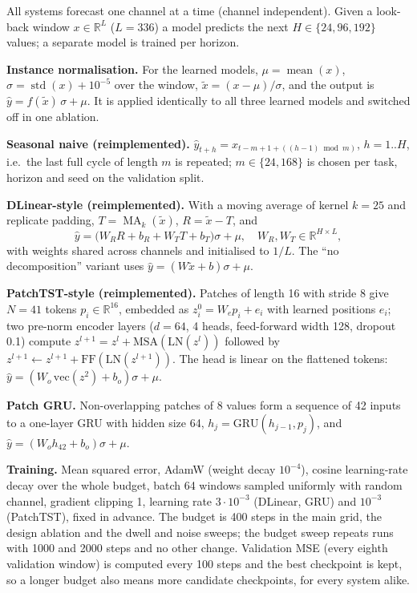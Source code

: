 All systems forecast one channel at a time (channel independent). Given a look-back window $x\in\mathbb{R}^{L}$ ($L=336$) a model predicts the next $H\in\{24,96,192\}$ values; a separate model is trained per horizon.

\textbf{Instance normalisation.} For the learned models, $\mu=\operatorname{mean}(x)$, $\sigma=\operatorname{std}(x)+10^{-5}$ over the window, $\tilde x=(x-\mu)/\sigma$, and the output is $\hat y=f(\tilde x)\,\sigma+\mu$. It is applied identically to all three learned models and switched off in one ablation.

\textbf{Seasonal naive (reimplemented).} $\hat y_{t+h}=x_{t-m+1+((h-1)\bmod m)}$, $h=1..H$, i.e.\ the last full cycle of length $m$ is repeated; $m\in\{24,168\}$ is chosen per task, horizon and seed on the validation split.

\textbf{DLinear-style (reimplemented).} With a moving average of kernel $k=25$ and replicate padding, $T=\operatorname{MA}_k(\tilde x)$, $R=\tilde x-T$, and
\begin{equation}\hat y=\big(W_R R + b_R + W_T T + b_T\big)\sigma+\mu,\quad W_R,W_T\in\mathbb{R}^{H\times L},\end{equation}
with weights shared across channels and initialised to $1/L$. The ``no decomposition'' variant uses $\hat y=(W\tilde x+b)\sigma+\mu$.

\textbf{PatchTST-style (reimplemented).} Patches of length 16 with stride 8 give $N=41$ tokens $p_i\in\mathbb{R}^{16}$, embedded as $z_i^{0}=W_e p_i+e_i$ with learned positions $e_i$; two pre-norm encoder layers ($d=64$, 4 heads, feed-forward width 128, dropout 0.1) compute $z^{l+1}=z^l+\mathrm{MSA}(\mathrm{LN}(z^l))$ followed by $z^{l+1}\leftarrow z^{l+1}+\mathrm{FF}(\mathrm{LN}(z^{l+1}))$. The head is linear on the flattened tokens: $\hat y=(W_o\,\mathrm{vec}(z^{2})+b_o)\sigma+\mu$.

\textbf{Patch GRU.} Non-overlapping patches of 8 values form a sequence of 42 inputs to a one-layer GRU with hidden size 64, $h_j=\mathrm{GRU}(h_{j-1},p_j)$, and $\hat y=(W_o h_{42}+b_o)\sigma+\mu$.

\textbf{Training.} Mean squared error, AdamW (weight decay $10^{-4}$), cosine learning-rate decay over the whole budget, batch 64 windows sampled uniformly with random channel, gradient clipping 1, learning rate $3\cdot10^{-3}$ (DLinear, GRU) and $10^{-3}$ (PatchTST), fixed in advance. The budget is 400 steps in the main grid, the design ablation and the dwell and noise sweeps; the budget sweep repeats runs with 1000 and 2000 steps and no other change. Validation MSE (every eighth validation window) is computed every 100 steps and the best checkpoint is kept, so a longer budget also means more candidate checkpoints, for every system alike.

